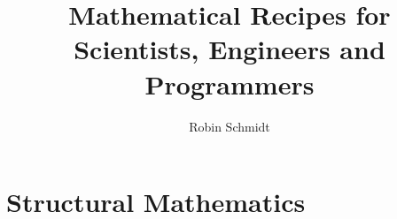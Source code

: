 


	
\parindent=0in
\parskip=0pt
		
 \setcounter{page}{1}

\author{Robin Schmidt}

\title{Mathematical Recipes for Scientists, Engineers and Programmers}
\maketitle

%
%

%
%


\part{Structural Mathematics}   %
% 

%

%
% 
 
 
% 


% 




